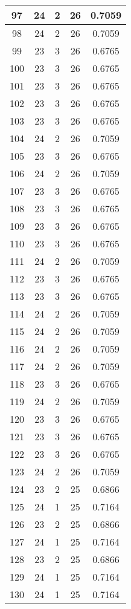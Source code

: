 \documentclass[letterpaper, 12pt]{article}
\begin{document}
\begin{longtable}{|c|c|c|c|c|}
\hline
97 & 24 & 2 & 26 & 0.7059 \\
\hline
98 & 24 & 2 & 26 & 0.7059 \\
\hline
99 & 23 & 3 & 26 & 0.6765 \\
\hline
100 & 23 & 3 & 26 & 0.6765 \\
\hline
101 & 23 & 3 & 26 & 0.6765 \\
\hline
102 & 23 & 3 & 26 & 0.6765 \\
\hline
103 & 23 & 3 & 26 & 0.6765 \\
\hline
104 & 24 & 2 & 26 & 0.7059 \\
\hline
105 & 23 & 3 & 26 & 0.6765 \\
\hline
106 & 24 & 2 & 26 & 0.7059 \\
\hline
107 & 23 & 3 & 26 & 0.6765 \\
\hline
108 & 23 & 3 & 26 & 0.6765 \\
\hline
109 & 23 & 3 & 26 & 0.6765 \\
\hline
110 & 23 & 3 & 26 & 0.6765 \\
\hline
111 & 24 & 2 & 26 & 0.7059 \\
\hline
112 & 23 & 3 & 26 & 0.6765 \\
\hline
113 & 23 & 3 & 26 & 0.6765 \\
\hline
114 & 24 & 2 & 26 & 0.7059 \\
\hline
115 & 24 & 2 & 26 & 0.7059 \\
\hline
116 & 24 & 2 & 26 & 0.7059 \\
\hline
117 & 24 & 2 & 26 & 0.7059 \\
\hline
118 & 23 & 3 & 26 & 0.6765 \\
\hline
119 & 24 & 2 & 26 & 0.7059 \\
\hline
120 & 23 & 3 & 26 & 0.6765 \\
\hline
121 & 23 & 3 & 26 & 0.6765 \\
\hline
122 & 23 & 3 & 26 & 0.6765 \\
\hline
123 & 24 & 2 & 26 & 0.7059 \\
\hline
124 & 23 & 2 & 25 & 0.6866 \\
\hline
125 & 24 & 1 & 25 & 0.7164 \\
\hline
126 & 23 & 2 & 25 & 0.6866 \\
\hline
127 & 24 & 1 & 25 & 0.7164 \\
\hline
128 & 23 & 2 & 25 & 0.6866 \\
\hline
129 & 24 & 1 & 25 & 0.7164 \\
\hline
130 & 24 & 1 & 25 & 0.7164 \\

\end{longtable}
\end{document}
